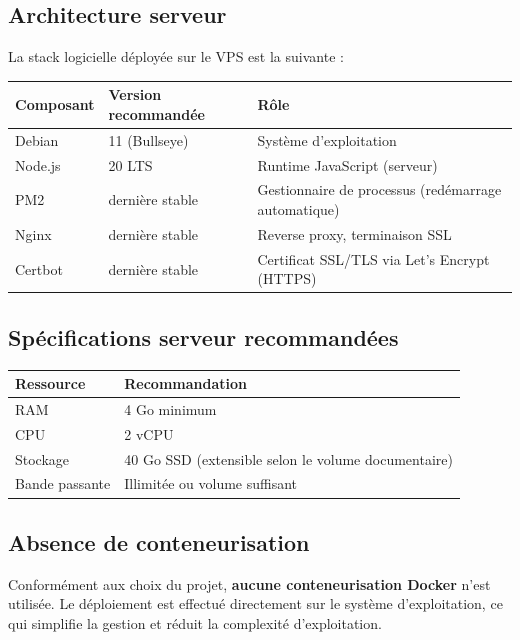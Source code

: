 \documentclass[a4paper,12pt,french]{article}
\begin{document}
\subsection{Architecture serveur}

La stack logicielle déployée sur le VPS est la suivante :

\begin{tabularx}{\textwidth}{l l X}
\toprule
\textbf{Composant} & \textbf{Version recommandée} & \textbf{Rôle} \\
\midrule
Debian & 11 (Bullseye) & Système d'exploitation \\
Node.js & 20 LTS & Runtime JavaScript (serveur) \\
PM2 & dernière stable & Gestionnaire de processus (redémarrage automatique) \\
Nginx & dernière stable & Reverse proxy, terminaison SSL \\
Certbot & dernière stable & Certificat SSL/TLS via Let's Encrypt (HTTPS) \\
\bottomrule
\end{tabularx}

\subsection{Spécifications serveur recommandées}

\begin{tabularx}{\textwidth}{l X}
\toprule
\textbf{Ressource} & \textbf{Recommandation} \\
\midrule
RAM & 4 Go minimum \\
CPU & 2 vCPU \\
Stockage & 40 Go SSD (extensible selon le volume documentaire) \\
Bande passante & Illimitée ou volume suffisant \\
\bottomrule
\end{tabularx}

\subsection{Absence de conteneurisation}

Conformément aux choix du projet, \textbf{aucune conteneurisation Docker} n'est utilisée. Le déploiement est effectué directement sur le système d'exploitation, ce qui simplifie la gestion et réduit la complexité d'exploitation.

\end{document}
